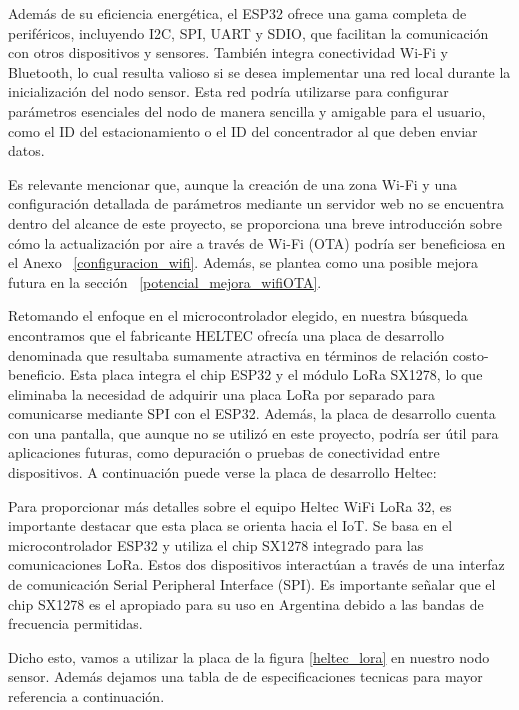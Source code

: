 Además de su eficiencia energética, el ESP32 ofrece una gama completa de periféricos, incluyendo I2C, SPI, UART y SDIO, que facilitan la comunicación con otros dispositivos y sensores. También integra conectividad Wi-Fi y Bluetooth, lo cual resulta valioso si se desea implementar una red local durante la inicialización del nodo sensor. Esta red podría utilizarse para configurar parámetros esenciales del nodo de manera sencilla y amigable para el usuario, como el ID del estacionamiento o el ID del concentrador al que deben enviar datos.

Es relevante mencionar que, aunque la creación de una zona Wi-Fi y una configuración detallada de parámetros mediante un servidor web no se encuentra dentro del alcance de este proyecto, se proporciona una breve introducción sobre cómo la actualización por aire a través de Wi-Fi (OTA) podría ser beneficiosa en el Anexo ~\ref{configuracion_wifi}. Además, se plantea como una posible mejora futura en la sección ~\ref{potencial_mejora_wifiOTA}.

Retomando el enfoque en el microcontrolador elegido, en nuestra búsqueda encontramos que el fabricante HELTEC ofrecía una placa de desarrollo denominada  que resultaba sumamente atractiva en términos de relación costo-beneficio. Esta placa integra el chip ESP32 y el módulo LoRa SX1278, lo que eliminaba la necesidad de adquirir una placa LoRa por separado para comunicarse mediante SPI con el ESP32. Además, la placa de desarrollo cuenta con una pantalla, que aunque no se utilizó en este proyecto, podría ser útil para aplicaciones futuras, como depuración o pruebas de conectividad entre dispositivos. A continuación puede verse la placa de desarrollo Heltec: 


Para proporcionar más detalles sobre el equipo Heltec WiFi LoRa 32, es importante destacar que esta placa se orienta hacia el IoT. Se basa en el microcontrolador ESP32 y utiliza el chip SX1278 integrado para las comunicaciones LoRa. Estos dos dispositivos interactúan a través de una interfaz de comunicación Serial Peripheral Interface (SPI). Es importante señalar que el chip SX1278 es el apropiado para su uso en Argentina debido a las bandas de frecuencia permitidas.

Dicho esto, vamos a utilizar la placa de la figura \ref{heltec_lora} en nuestro nodo sensor. Además dejamos una tabla de de especificaciones tecnicas para mayor referencia a continuación.


